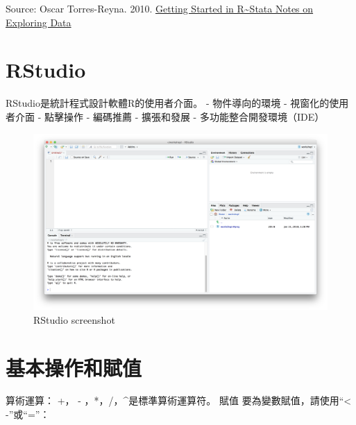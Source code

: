 \documentclass[]{book}
\begin{document}
Source: Oscar Torres-Reyna. 2010. \href{https://dss.princeton.edu/training/RStata.pdf}{Getting Started in R\textasciitilde Stata Notes on Exploring Data}

\hypertarget{rstudio}{%
\section{RStudio}\label{rstudio}}

RStudio是統計程式設計軟體R的使用者介面。
- 物件導向的環境
- 視窗化的使用者介面
- 點擊操作
- 編碼推薦
- 擴張和發展
- 多功能整合開發環境（IDE）

\begin{figure}
\includegraphics[width=1\linewidth]{RStudioscreenshot} \caption{RStudio screenshot}\label{fig:Rstudioscreenshot}
\end{figure}

\hypertarget{section-3}{%
\section{基本操作和賦值}\label{section-3}}

算術運算：
+， - ，*，/，\^{}是標準算術運算符。
賦值
要為變數賦值，請使用``\textless{} -''或``=''：
\end{document}
